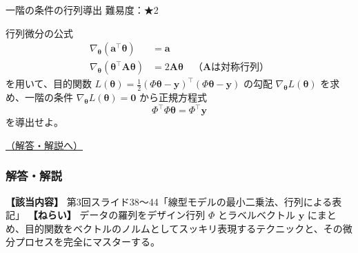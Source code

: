\begin{questionbox}[label=q:3-3-2]{一階の条件の行列導出 \hfill \normalfont \small 難易度：★2}

行列微分の公式 \begin{align*}
\nabla_{\boldsymbol{\theta}} (\mathbf{a}^\top \boldsymbol{\theta}) &= \mathbf{a} \\
\nabla_{\boldsymbol{\theta}} (\boldsymbol{\theta}^\top \mathbf{A} \boldsymbol{\theta}) &= 2\mathbf{A}\boldsymbol{\theta} \quad \text{（$\mathbf{A}$は対称行列）}
\end{align*} を用いて、目的関数
\(L(\boldsymbol{\theta}) = \frac{1}{2}(\Phi\boldsymbol{\theta} - \mathbf{y})^\top (\Phi\boldsymbol{\theta} - \mathbf{y})\)
の勾配 \(\nabla_{\boldsymbol{\theta}} L(\boldsymbol{\theta})\)
を求め、一階の条件
\(\nabla_{\boldsymbol{\theta}} L(\boldsymbol{\theta}) = \mathbf{0}\)
から正規方程式 \[
\Phi^\top \Phi \boldsymbol{\theta} = \Phi^\top \mathbf{y}
\] を導出せよ。

\hfill 

\hyperref[a:3-3-2]{（解答・解説へ）}

\end{questionbox}

\subsubsection{解答・解説}\label{ux89e3ux7b54ux89e3ux8aac-7}

\textbf{【該当内容】}
第3回スライド38〜44「線型モデルの最小二乗法、行列による表記」
\textbf{【ねらい】} データの羅列をデザイン行列 \(\Phi\) とラベルベクトル
\(\mathbf{y}\)
にまとめ、目的関数をベクトルのノルムとしてスッキリ表現するテクニックと、その微分プロセスを完全にマスターする。

